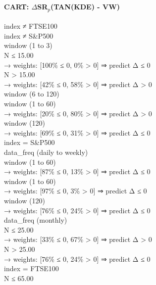 \
\paragraph{CART: $\Delta$SR$_p$(TAN(KDE) - VW)}

\begin{flushleft}
\ttfamily %
index ≠ FTSE100 \\
\quad index ≠ S\&P500 \\
\quad \quad window (1 to 3) \\
\quad \quad \quad N ≤ 15.00 \\
\quad \quad \quad \quad → weights: [100\% ≤ 0, 0\% > 0] ⇒ predict Δ ≤ 0 \\
\quad \quad \quad N > 15.00 \\
\quad \quad \quad \quad → weights: [42\% ≤ 0, 58\% > 0] ⇒ predict Δ > 0 \\
\quad \quad window (6 to 120) \\
\quad \quad \quad window (1 to 60) \\
\quad \quad \quad \quad → weights: [20\% ≤ 0, 80\% > 0] ⇒ predict Δ > 0 \\
\quad \quad \quad window (120) \\
\quad \quad \quad \quad → weights: [69\% ≤ 0, 31\% > 0] ⇒ predict Δ ≤ 0 \\
\quad index = S\&P500 \\
\quad \quad data\_freq (daily to weekly) \\
\quad \quad \quad window (1 to 60) \\
\quad \quad \quad \quad → weights: [87\% ≤ 0, 13\% > 0] ⇒ predict Δ ≤ 0 \\
\quad \quad \quad window (1 to 60) \\
\quad \quad \quad \quad → weights: [97\% ≤ 0, 3\% > 0] ⇒ predict Δ ≤ 0 \\
\quad \quad \quad window (120) \\
\quad \quad \quad \quad → weights: [76\% ≤ 0, 24\% > 0] ⇒ predict Δ ≤ 0 \\
\quad \quad data\_freq (monthly) \\
\quad \quad \quad N ≤ 25.00 \\
\quad \quad \quad \quad → weights: [33\% ≤ 0, 67\% > 0] ⇒ predict Δ > 0 \\
\quad \quad \quad N > 25.00 \\
\quad \quad \quad \quad → weights: [76\% ≤ 0, 24\% > 0] ⇒ predict Δ ≤ 0 \\
index = FTSE100 \\
\quad N ≤ 65.00 \\

\end{flushleft}
